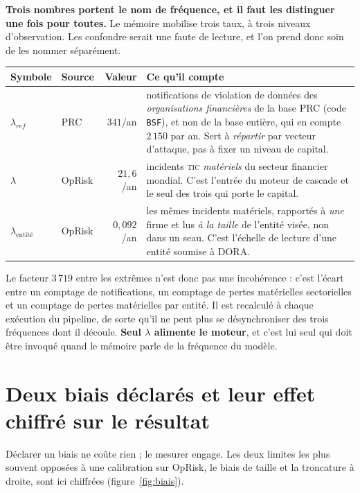 \begin{attention}
\textbf{Trois nombres portent le nom de \og{}fréquence\fg{}, et il faut les distinguer une
fois pour toutes.} Le mémoire mobilise trois taux, à trois niveaux d'observation. Les
confondre serait une faute de lecture, et l'on prend donc soin de les nommer séparément.
\begin{center}\small
\renewcommand{\arraystretch}{1.3}
\begin{tabular}{@{}l l r p{5.1cm}@{}}
\toprule
\textbf{Symbole} & \textbf{Source} & \textbf{Valeur} & \textbf{Ce qu'il compte} \\
\midrule
$\lambda_{ref}$ & PRC & $341$/an & notifications de violation de données des
\emph{organisations financières} de la base PRC (code \texttt{BSF}), et non de la base
entière, qui en compte $2\,150$ par an. Sert à \emph{répartir} par vecteur d'attaque, pas à
fixer un niveau de capital. \\
$\lambda$ & OpRisk & $21{,}6$/an & incidents \textsc{tic} \emph{matériels} du secteur
financier mondial. C'est l'entrée du moteur de cascade et le seul des trois qui
porte le capital. \\
$\lambda_{\text{entité}}$ & OpRisk & $0{,}092$/an & les mêmes incidents matériels, rapportés
à \emph{une} firme et lus \emph{à la taille} de l'entité visée, non dans un seau. C'est
l'échelle de lecture d'une entité soumise à DORA. \\
\bottomrule
\end{tabular}
\end{center}
\vspace{2pt}
Le facteur $3\,719$ entre les extrêmes n'est donc pas une incohérence : c'est l'écart entre
un comptage de notifications, un comptage de pertes matérielles sectorielles et un comptage
de pertes matérielles par entité. Il est recalculé à chaque exécution du pipeline, de sorte
qu'il ne peut plus se désynchroniser des trois fréquences dont il découle.
\textbf{Seul $\lambda$ alimente le
moteur}, et c'est lui
seul qui doit être invoqué quand le mémoire parle de \og{}la fréquence du modèle\fg{}.
\end{attention}

\section{Deux biais déclarés et leur effet chiffré sur le résultat}
\label{sec:biais-chiffres}

Déclarer un biais ne coûte rien ; le mesurer engage. Les deux limites les plus souvent
opposées à une calibration sur OpRisk, le biais de taille et la troncature à droite, sont
ici chiffrées (figure~\ref{fig:biais}).

